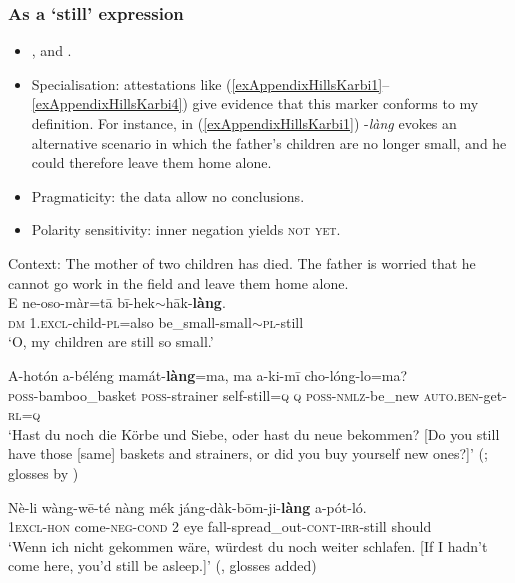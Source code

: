 \subsubsection{As a \lq{}still\rq{ }expression}
\begin{itemize}
	\item \textcite[103]{Gruessner1978}, \textcite[222–223, 299]{Konnerth2014} and \textcite[424]{Taro2010}.
	\item Specialisation: attestations like (\ref{exAppendixHillsKarbi1}–\ref{exAppendixHillsKarbi4}) give evidence that this marker conforms to my definition. For instance, in (\ref{exAppendixHillsKarbi1}) \mbox{-\textit{làng}} evokes an alternative scenario in which the father's children are no longer small, and he could therefore leave them home alone.
	\item Pragmaticity: the data allow no conclusions.
	\item Polarity sensitivity: inner negation yields \textsc{not yet}.
\end{itemize}
\begin{exe}
	\ex\label{exAppendixHillsKarbi1}
	 Context: The mother of two children has died. The father is worried that he cannot go work in the field and leave them home alone.\\
	\gll E ne-oso-màr=tā bī-hek$\sim$hāk-\textbf{làng}.\\
	\textsc{dm} 1.\textsc{excl}-child-\textsc{pl}=also be\_small-small$\sim$\textsc{pl}-still\\
	\glt \lq O, my children are still so small.' \parencite[159]{KonnerthTisso2018}
	
	\ex\label{exAppendixHillsKarbi3}
	\gll A-hotón a-béléng mamát-\textbf{làng}=ma, ma a-ki-mī cho-lóng-lo=ma?\\
	\textsc{poss}-bamboo\_basket \textsc{poss}-strainer self-still=\textsc{q} \textsc{q} \textsc{poss}-\textsc{nmlz}-be\_new \textsc{auto}.\textsc{ben}-get-\textsc{rl}=\textsc{q}\\
	\glt \lq Hast du noch die Körbe und Siebe, oder hast du neue bekommen? [Do you still have those [same] baskets and strainers, or did you buy yourself new ones?]' (\cite[129]{Gruessner1978}; glosses by \cite[528]{Konnerth2014})
	
	\ex\label{exAppendixHillsKarbi4}
	\gll Nè-li wàng-wē-té nàng mék jáng-dàk-bōm-ji-\textbf{làng} a-pót-ló.\\
	1\textsc{excl}-\textsc{hon} come-\textsc{neg}-\textsc{cond} 2 eye fall-spread\_out-\textsc{cont}-\textsc{irr}-still should\\
	\glt \lq Wenn ich nicht gekommen wäre, würdest du noch weiter schlafen. [If I hadn't come here, you'd still be asleep.]' (\cite[138]{Gruessner1978}, glosses added)
\end{exe}

